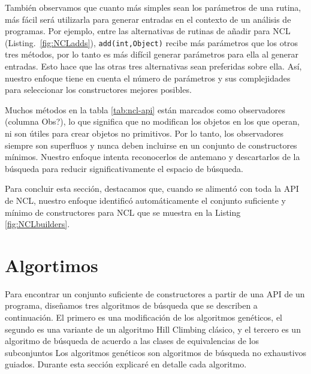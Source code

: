 También observamos que cuanto más simples sean los parámetros de una rutina, más fácil será utilizarla para generar entradas en el contexto de un análisis de programas. Por ejemplo, entre las alternativas de rutinas de añadir para NCL (Listing.~\ref{fig:NCLadds}), \texttt{add(int,Object)} recibe más parámetros que los otros tres métodos, por lo tanto es más difícil generar parámetros para ella al generar entradas. Esto hace que las otras tres alternativas sean preferidas sobre ella. Así, nuestro enfoque tiene en cuenta el número de parámetros y sus complejidades para seleccionar los constructores mejores posibles.

Muchos métodos en la tabla \ref{tab:ncl-api} están marcados como observadores (columna Obs?), lo que significa que no modifican los objetos en los que operan, ni son útiles para crear objetos no primitivos. Por lo tanto, los observadores siempre son superfluos y nunca deben incluirse en un conjunto de constructores mínimos. Nuestro enfoque intenta reconocerlos de antemano y descartarlos de la búsqueda para reducir significativamente el espacio de búsqueda.

Para concluir esta sección, destacamos que, cuando se alimentó con toda la API de NCL, nuestro enfoque identificó automáticamente el conjunto suficiente y mínimo de constructores para NCL que se muestra en la Listing \ref{fig:NCLbuilders}.

\section{Algortimos}
Para encontrar un conjunto suficiente de constructores a partir de una API de un programa, diseñamos tres algoritmos de búsqueda que se describen a continuación. El primero es una modificación de los algoritmos genéticos, el segundo es una variante de un algoritmo Hill Climbing clásico, y el tercero es un algoritmo de búsqueda de acuerdo a las clases de equivalencias de los subconjuntos
Los algoritmos genéticos \cite{Goldberg:1989} son algoritmos de búsqueda no exhaustivos guiados. \cite{Michalewicz:1996}
Durante esta sección explicaré en detalle cada algoritmo.

